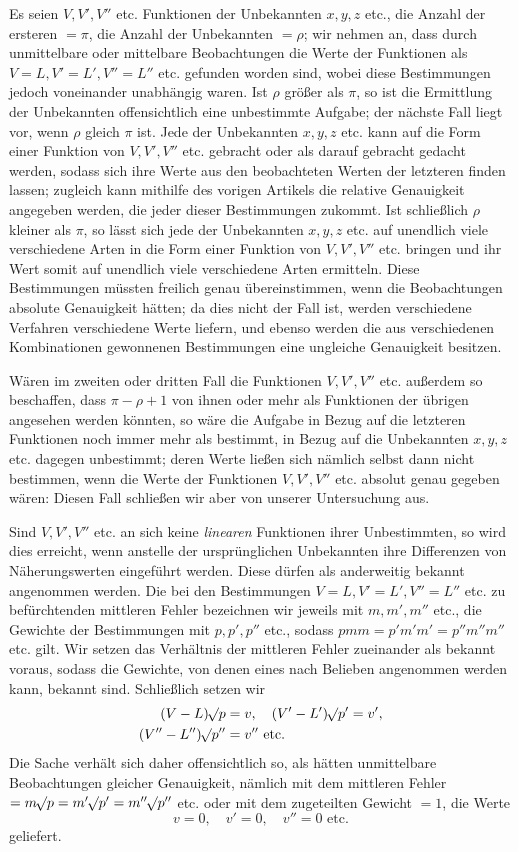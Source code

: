 Es seien \(V,V',V''\) etc. Funktionen der Unbekannten \(x,y,z\) etc., die Anzahl der ersteren \(=\pi\), die Anzahl der Unbekannten \(=\rho\); wir nehmen an, dass durch unmittelbare oder mittelbare Beobachtungen die Werte der Funktionen als \(V=L,V'=L',V''=L''\) etc. gefunden worden sind, wobei diese Bestimmungen jedoch voneinander unabhängig waren. Ist \(\rho\) größer als \(\pi\), so ist die Ermittlung der Unbekannten offensichtlich eine unbestimmte Aufgabe; der nächste Fall liegt vor, wenn \(\rho\) gleich \(\pi\) ist. Jede der Unbekannten \(x,y,z\) etc. kann auf die Form einer Funktion von \(V,V',V''\) etc. gebracht oder als darauf gebracht gedacht werden, sodass sich ihre Werte aus den beobachteten Werten der letzteren finden lassen; zugleich kann mithilfe des vorigen Artikels die relative Genauigkeit angegeben werden, die jeder dieser Bestimmungen zukommt. Ist schließlich \(\rho\) kleiner als \(\pi\), so lässt sich jede der Unbekannten \(x,y,z\) etc. auf unendlich viele verschiedene Arten in die Form einer Funktion von \(V,V',V''\) etc. bringen und ihr Wert somit auf unendlich viele verschiedene Arten ermitteln. Diese Bestimmungen müssten freilich genau übereinstimmen, wenn die Beobachtungen absolute Genauigkeit hätten; da dies nicht der Fall ist, werden verschiedene Verfahren verschiedene Werte liefern, und ebenso werden die aus verschiedenen Kombinationen gewonnenen Bestimmungen eine ungleiche Genauigkeit besitzen.

Wären im zweiten oder dritten Fall die Funktionen \(V,V',V''\) etc. außerdem so beschaffen, dass \(\pi-\rho+1\) von ihnen oder mehr als Funktionen der übrigen angesehen werden könnten, so wäre die Aufgabe in Bezug auf die letzteren Funktionen noch immer mehr als bestimmt, in Bezug auf die Unbekannten \(x,y,z\) etc. dagegen unbestimmt; deren Werte ließen sich nämlich selbst dann nicht bestimmen, wenn die Werte der Funktionen \(V,V',V''\) etc. absolut genau gegeben wären: Diesen Fall schließen wir aber von unserer Untersuchung aus.

Sind \(V,V',V''\) etc. an sich keine \textit{linearen} Funktionen ihrer Unbestimmten, so wird dies erreicht, wenn anstelle der ursprünglichen Unbekannten ihre Differenzen von Näherungswerten eingeführt werden. Diese dürfen als anderweitig bekannt angenommen werden. Die bei den Bestimmungen \(V=L,V'=L',V''=L''\) etc. zu befürchtenden mittleren Fehler bezeichnen wir jeweils mit \(m,m',m''\) etc., die Gewichte der Bestimmungen mit \(p,p',p''\) etc., sodass \(pmm=p'm'm'=p''m''m''\) etc. gilt. Wir setzen das Verhältnis der mittleren Fehler zueinander als bekannt voraus, sodass die Gewichte, von denen eines nach Belieben angenommen werden kann, bekannt sind. Schließlich setzen wir
\[
\begin{aligned}
(V-L)\mathord{{}^{}\!\surd}p&=v,\quad(V'-L')\mathord{{}^{}\!\surd}p'=v',\\
(V''-L'')\mathord{{}^{}\!\surd}p''&=v''\text{ etc.}
\end{aligned}
\]
Die Sache verhält sich daher offensichtlich so, als hätten unmittelbare Beobachtungen gleicher Genauigkeit, nämlich mit dem mittleren Fehler \(=m\mathord{{}^{}\!\surd}p=m'\mathord{{}^{}\!\surd}p'=m''\mathord{{}^{}\!\surd}p''\) etc. oder mit dem zugeteilten Gewicht \(=1\), die Werte
\[
v=0,\quad v'=0,\quad v''=0\text{ etc.}
\]
geliefert.

\clearpage
